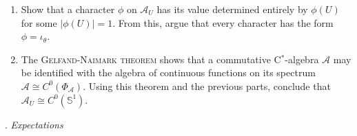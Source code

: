 \begin{enumerate}[label=(\alph*), itemsep=-1pt]
\begin{enumerate}[label=\roman*., itemsep=-1pt]
    $\mathcal{A}$ as the set of
    multiplicative functionals $\phi: \mathcal{A} \to \mathbb{C}$,
    also called \emph{characters}. %
    Argue that, for $\theta \in [0, 2\pi)$, the evaluation functional
    \[
      \iota_\theta (A) = A \mathbf{1} (e^{i\theta})
    \]
    is a character of $\mathcal{A}_U$.
  \item Show that a character $\phi$ on $\mathcal{A}_U$ has its value
    determined entirely by $\phi(U)$ for some $|\phi(U)|=1$. From
    this, argue that every character has the form $\phi = \iota_\theta$.
  \item The \textsc{Gelfand-Naimark theorem} shows that a commutative
    C${}^*$-algebra $\mathcal{A}$ may be identified with the algebra of continuous
    functions on its spectrum $\mathcal{A} \cong
    C^0(\Phi_\mathcal{A})$. Using this theorem and the previous parts,
    conclude that $\mathcal{A}_U \cong C^0(\mathbb{S}^1)$.
  \end{enumerate}
      \end{enumerate}


\vspace{5pt}
\begin{Large}
  . \emph{Expectations} 
\end{Large}
\vspace{5pt}

